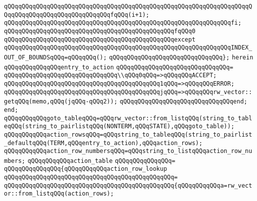 \verb|qQQqqQQqqQQqqQQqqQQqqQQqqQQqqQQqqQQqqQQqqQQqqQQqqQQqqQQqqQQqqQQqqQQqqQQqqQQqqQQqqQQqqQQqqQQqqQQqqQQqfqQQq(i+1);|\newline
\verb|qQQqqQQqqQQqqQQqqQQqqQQqqQQqqQQqqQQqqQQqqQQqqQQqqQQqqQQqqQQqqQQqfi;|\newline
\newline
\verb|qQQqqQQqqQQqqQQqqQQqqQQqqQQqqQQqqQQqqQQqqQQqqQQqfqQQq0|\newline
\verb|qQQqqQQqqQQqqQQqqQQqqQQqqQQqqQQqqQQqqQQqqQQqqQQqexcept|\newline
\verb|qQQqqQQqqQQqqQQqqQQqqQQqqQQqqQQqqQQqqQQqqQQqqQQqqQQqqQQqqQQqqQQqINDEX_OUT_OF_BOUNDSqQQq=qQQqqQQq();|\newline
\verb|qQQqqQQqqQQqqQQqqQQqqQQqqQQqqQQq};|\newline
\verb|herein|\newline
\verb|qQQqqQQqqQQqqQQqentry_to_action|\newline
\verb|qQQqqQQqqQQqqQQqqQQqqQQqqQQqqQQq=|\newline
\verb|qQQqqQQqqQQqqQQqqQQqqQQqqQQqqQQq\\qQQq0qQQq=>qQQqqQQqACCEPT;|\newline
\verb|qQQqqQQqqQQqqQQqqQQqqQQqqQQqqQQqqQQqqQQqqQQq1qQQq=>qQQqqQQqERROR;|\newline
\verb|qQQqqQQqqQQqqQQqqQQqqQQqqQQqqQQqqQQqqQQqqQQqjqQQq=>qQQqqQQqrw_vector::getqQQq(memo,qQQq(jqQQq-qQQq2));|\newline
\verb|qQQqqQQqqQQqqQQqqQQqqQQqqQQqqQQqend;|\newline
\verb|end;|\newline
\newline
\verb|qQQqqQQqqQQqgoto_tableqQQq=qQQqrw_vector::from_listqQQq(string_to_tableqQQq(string_to_pairlistqQQq(NONTERM,qQQqSTATE),qQQqgoto_table));|\newline
\verb|qQQqqQQqqQQqaction_rowsqQQq=qQQqstring_to_tableqQQq(string_to_pairlist_defaultqQQq(TERM,qQQqentry_to_action),qQQqaction_rows);|\newline
\verb|qQQqqQQqqQQqaction_row_numbersqQQq=qQQqstring_to_listqQQqaction_row_numbers;|\newline
\verb|qQQqqQQqqQQqaction_table|\newline
\verb|qQQqqQQqqQQqqQQq=|\newline
\verb|qQQqqQQqqQQqqQQq{qQQqqQQqqQQqaction_row_lookup|\newline
\verb|qQQqqQQqqQQqqQQqqQQqqQQqqQQqqQQqqQQqqQQqqQQqqQQq=|\newline
\verb|qQQqqQQqqQQqqQQqqQQqqQQqqQQqqQQqqQQqqQQqqQQqqQQq{qQQqqQQqqQQqa=rw_vector::from_listqQQq(action_rows);|\newline
